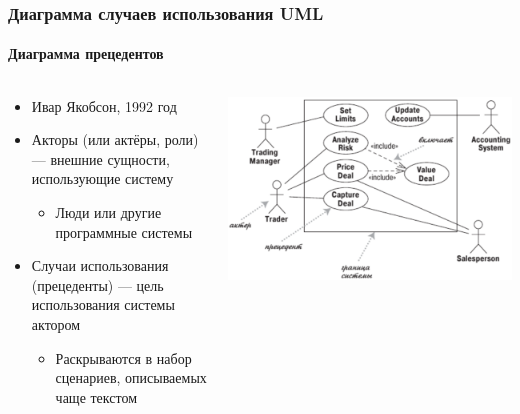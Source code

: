 \documentclass{../cscslides}
\begin{document}
    \begin{frame}
        \frametitle{Диаграмма случаев использования UML}
        \framesubtitle{Диаграмма прецедентов}
        \begin{columns}
            \begin{column}{0.5\textwidth}
                \begin{itemize}
                    \item Ивар Якобсон, 1992 год
                    \item Акторы (или актёры, роли) --- внешние сущности, использующие систему
                    \begin{itemize}
                        \item Люди или другие программные системы
                    \end{itemize}
                    \item Случаи использования (прецеденты)  --- цель использования системы актором
                    \begin{itemize}
                        \item Раскрываются в набор сценариев, описываемых чаще текстом
                    \end{itemize}
                \end{itemize}
            \end{column}
            \begin{column}{0.5\textwidth}
                \begin{center}
                    \includegraphics[width=\textwidth]{useCaseDiagram.png}
                \end{center}
            \end{column}
        \end{columns}
    \end{frame}
\end{document}
